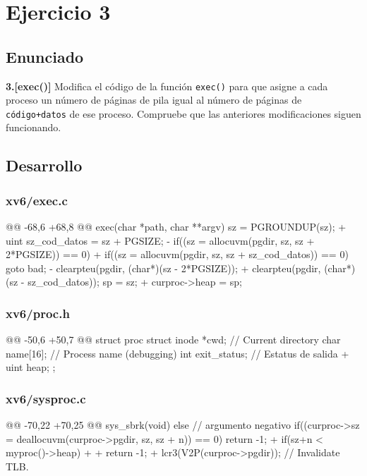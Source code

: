 \section{Ejercicio 3}

\subsection{Enunciado}
\begin{ejer}
    \textbf{3.[exec()]} Modifica el código de la función \texttt{exec()} para que asigne 
    a cada proceso un número de páginas de pila igual al número de páginas de \texttt{código+datos} 
    de ese proceso. Compruebe que las anteriores modificaciones siguen funcionando.
\end{ejer}

\subsection{Desarrollo}

\subsubsection{xv6/exec.c}
\begin{listing}
@@ -68,6 +68,8 @@ exec(char *path, char **argv)
    sz = PGROUNDUP(sz);
+   uint sz_cod_datos = sz + PGSIZE;
-   if((sz = allocuvm(pgdir, sz, sz + 2*PGSIZE)) == 0)    
+   if((sz = allocuvm(pgdir, sz, sz + sz_cod_datos)) == 0)
        goto bad;
-   clearpteu(pgdir, (char*)(sz - 2*PGSIZE));
+   clearpteu(pgdir, (char*)(sz - sz_cod_datos));
    sp = sz;
+   curproc->heap = sp;
\end{listing}

\subsubsection{xv6/proc.h}
\begin{listing}
@@ -50,6 +50,7 @@ struct proc {
        struct inode *cwd;           // Current directory
        char name[16];               // Process name (debugging)
        int exit_status;             // Estatus de salida
+       uint heap;   
    };
\end{listing}

\subsubsection{xv6/sysproc.c}
\begin{listing}
@@ -70,22 +70,25 @@ sys_sbrk(void)
    else // argumento negativo
    {
        if((curproc->sz = deallocuvm(curproc->pgdir, sz, sz + n)) == 0)
            return -1;
+       if(sz+n < myproc()->heap)
+       {
+           return -1;
+       }
    }
    lcr3(V2P(curproc->pgdir));  // Invalidate TLB.
\end{listing}
